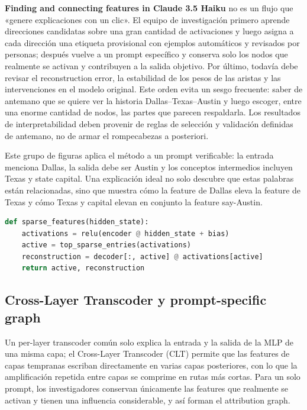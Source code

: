 \textbf{Finding and connecting features in Claude 3.5 Haiku} no es un flujo que «genere explicaciones con un clic». El equipo de investigación primero aprende direcciones candidatas sobre una gran cantidad de activaciones y luego asigna a cada dirección una etiqueta provisional con ejemplos automáticos y revisados por personas; después vuelve a un prompt específico y conserva solo los nodos que realmente se activan y contribuyen a la salida objetivo. Por último, todavía debe revisar el reconstruction error, la estabilidad de los pesos de las aristas y las intervenciones en el modelo original. Este orden evita un sesgo frecuente: saber de antemano que se quiere ver la historia Dallas--Texas--Austin y luego escoger, entre una enorme cantidad de nodos, las partes que parecen respaldarla. Los resultados de interpretabilidad deben provenir de reglas de selección y validación definidas de antemano, no de armar el rompecabezas a posteriori.


Este grupo de figuras aplica el método a un prompt verificable: la entrada menciona Dallas, la salida debe ser Austin y los conceptos intermedios incluyen Texas y state capital. Una explicación ideal no solo descubre que estas palabras están relacionadas, sino que muestra cómo la feature de Dallas eleva la feature de Texas y cómo Texas y capital elevan en conjunto la feature say-Austin.

\begin{lstlisting}[language=Python,caption={Extracción de features dispersas: aproximar la salida densa de la MLP con unas pocas direcciones no nulas}]
def sparse_features(hidden_state):
    activations = relu(encoder @ hidden_state + bias)
    active = top_sparse_entries(activations)
    reconstruction = decoder[:, active] @ activations[active]
    return active, reconstruction
\end{lstlisting}

\subsection{Cross-Layer Transcoder y prompt-specific graph}

Un per-layer transcoder común solo explica la entrada y la salida de la MLP de una misma capa; el Cross-Layer Transcoder (CLT) permite que las features de capas tempranas escriban directamente en varias capas posteriores, con lo que la amplificación repetida entre capas se comprime en rutas más cortas. Para un solo prompt, los investigadores conservan únicamente las features que realmente se activan y tienen una influencia considerable, y así forman el attribution graph.

